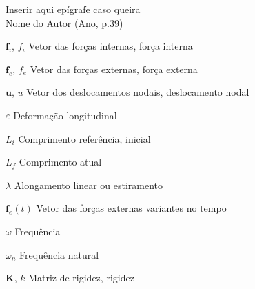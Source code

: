 \documentclass[oneside, a4paper, 12pt, chapter=TITLE]{abntex2} 	%
\begin{document}



\begin{epigrafe}
	\vspace*{\fill} 
\begin{flushright}
Inserir aqui epígrafe caso queira\\
\vspace*{1cm}
Nome do Autor (Ano, p.39)
\end{flushright}
\end{epigrafe}

\listoffigures*
\cleardoublepage
\listoftables*
\cleardoublepage
\listofalgorithms
\cleardoublepage
\begin{simbolos}
		\item[$\boldsymbol f_i$, $f_i$]\quad Vetor das forças internas, força interna
		\item[$\boldsymbol f_e$, $f_e$]\quad Vetor das forças externas, força externa
		\item[$\boldsymbol u$, $u$]\quad Vetor dos deslocamentos nodais, deslocamento nodal
		\item [$\varepsilon$]\quad Deformação longitudinal
		\item [$L_i$]\quad Comprimento referência, inicial
		\item [$L_f$]\quad Comprimento atual
		\item [$\lambda$]\quad Alongamento linear ou estiramento
		\item[$\boldsymbol f_e(t)$]\quad Vetor das forças externas variantes no tempo
		\item[$\omega$]\quad Frequência
		\item[$\omega_{n}$]\quad Frequência natural
		\item [$\boldsymbol K $, $ k $]\quad Matriz de rigidez, rigidez
	\end{simbolos}
\end{document}
